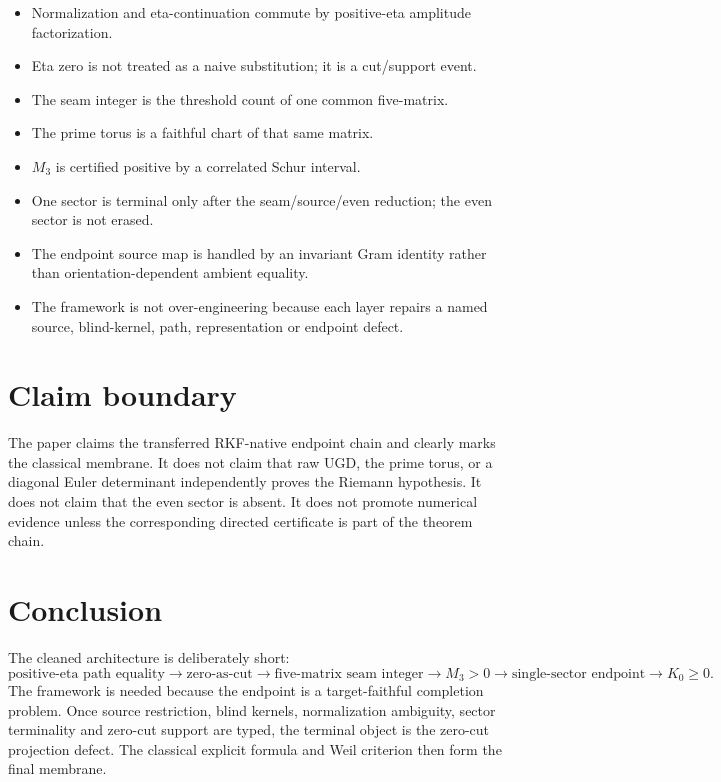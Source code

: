 \documentclass[11pt]{article}
\begin{document}
\begin{itemize}
\item Normalization and eta-continuation commute by positive-eta amplitude factorization.
\item Eta zero is not treated as a naive substitution; it is a cut/support event.
\item The seam integer is the threshold count of one common five-matrix.
\item The prime torus is a faithful chart of that same matrix.
\item \(M_3\) is certified positive by a correlated Schur interval.
\item One sector is terminal only after the seam/source/even reduction; the even sector is not erased.
\item The endpoint source map is handled by an invariant Gram identity rather than orientation-dependent ambient equality.
\item The framework is not over-engineering because each layer repairs a named source, blind-kernel, path, representation or endpoint defect.
\end{itemize}

\section{Claim boundary}

The paper claims the transferred RKF-native endpoint chain and clearly marks the classical membrane.  It does not claim that raw UGD, the prime torus, or a diagonal Euler determinant independently proves the Riemann hypothesis.  It does not claim that the even sector is absent.  It does not promote numerical evidence unless the corresponding directed certificate is part of the theorem chain.

\section{Conclusion}

The cleaned architecture is deliberately short:
\[
\text{positive-eta path equality}
\to
\text{zero-as-cut}
\to
\text{five-matrix seam integer}
\to
M_3>0
\to
\text{single-sector endpoint}
\to
K_0\ge0.
\]
The framework is needed because the endpoint is a target-faithful completion problem.  Once source restriction, blind kernels, normalization ambiguity, sector terminality and zero-cut support are typed, the terminal object is the zero-cut projection defect.  The classical explicit formula and Weil criterion then form the final membrane.
\end{document}
